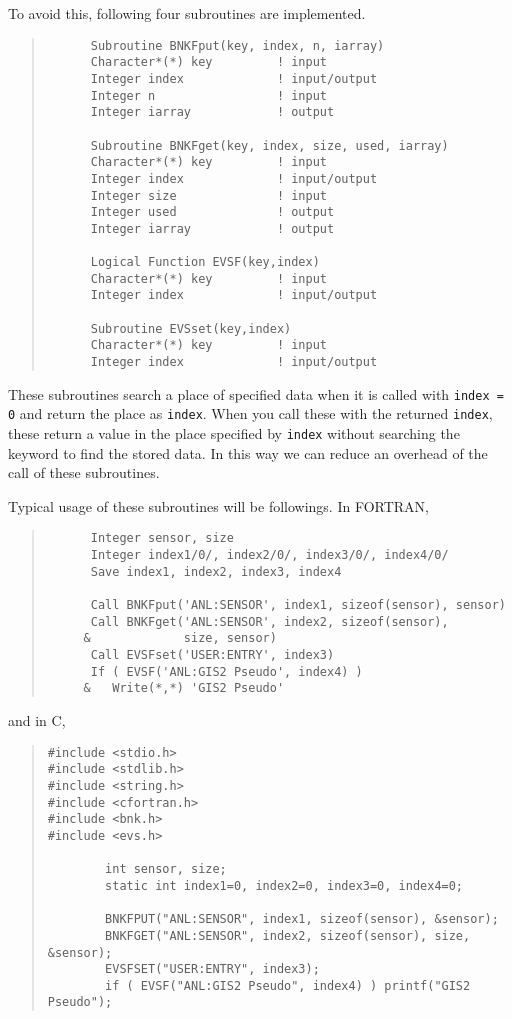 To avoid this,
following four subroutines are implemented.

\begin{quote}\baselineskip 3.2mm\begin{verbatim}
      Subroutine BNKFput(key, index, n, iarray)
      Character*(*) key         ! input
      Integer index             ! input/output
      Integer n                 ! input
      Integer iarray            ! output

      Subroutine BNKFget(key, index, size, used, iarray)
      Character*(*) key         ! input
      Integer index             ! input/output
      Integer size              ! input
      Integer used              ! output
      Integer iarray            ! output

      Logical Function EVSF(key,index)
      Character*(*) key         ! input
      Integer index             ! input/output

      Subroutine EVSset(key,index)
      Character*(*) key         ! input
      Integer index             ! input/output
\end{verbatim}\end{quote}

These subroutines search a place of specified data
when it is called with {\tt index = 0}
and return the place as {\tt index}.
When you call these with the returned {\tt index},
these return a value in the place specified by {\tt index}
without searching the keyword to find the stored data.
In this way
we can reduce an overhead of the call of these subroutines.

Typical usage of these subroutines will be followings.
In FORTRAN,
\begin{quote}\baselineskip 3.2mm\begin{verbatim}
      Integer sensor, size
      Integer index1/0/, index2/0/, index3/0/, index4/0/
      Save index1, index2, index3, index4

      Call BNKFput('ANL:SENSOR', index1, sizeof(sensor), sensor)
      Call BNKFget('ANL:SENSOR', index2, sizeof(sensor),
     &             size, sensor)
      Call EVSFset('USER:ENTRY', index3)
      If ( EVSF('ANL:GIS2 Pseudo', index4) )
     &   Write(*,*) 'GIS2 Pseudo'
\end{verbatim}\end{quote}
%
and in C,
\begin{quote}\baselineskip 3.2mm\begin{verbatim}
#include <stdio.h>
#include <stdlib.h>
#include <string.h>
#include <cfortran.h>
#include <bnk.h>
#include <evs.h>

        int sensor, size;
        static int index1=0, index2=0, index3=0, index4=0;
        
        BNKFPUT("ANL:SENSOR", index1, sizeof(sensor), &sensor);
        BNKFGET("ANL:SENSOR", index2, sizeof(sensor), size, &sensor);
        EVSFSET("USER:ENTRY", index3);
        if ( EVSF("ANL:GIS2 Pseudo", index4) ) printf("GIS2 Pseudo");
\end{verbatim}\end{quote}

